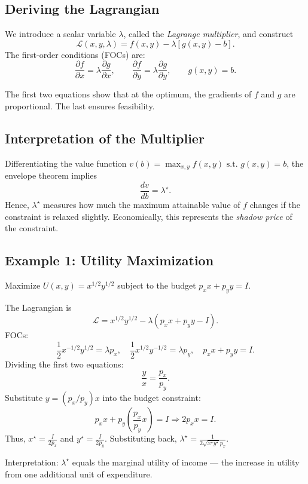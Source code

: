 \documentclass[12pt]{article}
\newcommand{\Lag}{\mathcal{L}}
\begin{document}
\subsection*{Deriving the Lagrangian}

We introduce a scalar variable \( \lambda \), called the \textit{Lagrange multiplier}, and construct
\[
\Lag(x,y,\lambda) = f(x,y) - \lambda [g(x,y) - b].
\]
The first-order conditions (FOCs) are:
\[
\frac{\partial f}{\partial x} = \lambda \frac{\partial g}{\partial x}, \qquad
\frac{\partial f}{\partial y} = \lambda \frac{\partial g}{\partial y}, \qquad
g(x,y) = b.
\]

The first two equations show that at the optimum, the gradients of \( f \) and \( g \) are proportional. The last ensures feasibility.

\subsection*{Interpretation of the Multiplier}

Differentiating the value function \( v(b) = \max_{x,y} f(x,y) \text{ s.t. } g(x,y)=b \), the envelope theorem implies
\[
\frac{dv}{db} = \lambda^\star.
\]
Hence, \( \lambda^\star \) measures how much the maximum attainable value of \( f \) changes if the constraint is relaxed slightly. Economically, this represents the \textit{shadow price} of the constraint.

\subsection*{Example 1: Utility Maximization}

Maximize \( U(x,y) = x^{1/2}y^{1/2} \) subject to the budget \( p_x x + p_y y = I \).

The Lagrangian is
\[
\Lag = x^{1/2}y^{1/2} - \lambda(p_x x + p_y y - I).
\]
FOCs:
\[
\frac{1}{2}x^{-1/2}y^{1/2} = \lambda p_x, \quad
\frac{1}{2}x^{1/2}y^{-1/2} = \lambda p_y, \quad
p_x x + p_y y = I.
\]
Dividing the first two equations:
\[
\frac{y}{x} = \frac{p_x}{p_y}.
\]
Substitute \( y = (p_x/p_y)x \) into the budget constraint:
\[
p_x x + p_y \left(\frac{p_x}{p_y}x\right) = I \Rightarrow 2p_x x = I.
\]
Thus, \( x^\star = \frac{I}{2p_x} \) and \( y^\star = \frac{I}{2p_y} \). Substituting back, \( \lambda^\star = \frac{1}{2\sqrt{x^\star y^\star} p_x} \).

Interpretation: \( \lambda^\star \) equals the marginal utility of income — the increase in utility from one additional unit of expenditure.
\end{document}
